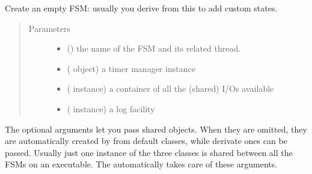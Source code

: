 \documentclass[letterpaper,10pt,english]{sphinxmanual}
\begin{document}
\begin{fulllineitems}
\label{\detokenize{fsm:fsmBase}}
Create an empty FSM: usually you derive from this to add custom states.
\begin{quote}\begin{description}
\item[{Parameters}] \leavevmode\begin{itemize}
\item {} 
 () \textendash{} the name of the FSM and its related thread.

\item {} 
 ({\hyperref[\detokenize{timer:fsmTimers}]{}} object) \textendash{} a timer manager instance

\item {} 
 ({\hyperref[\detokenize{io:fsmIOs}]{}} instance) \textendash{} a container of all the (shared) I/Os available

\item {} 
 ({\hyperref[\detokenize{logger:fsmLogger}]{}} instance) \textendash{} a log facility

\end{itemize}

\end{description}\end{quote}

The optional arguments let you pass shared objects. When they are omitted,
they are automatically created by {\hyperref[\detokenize{fsm:fsmBase}]{}} from default classes,
while derivate ones can be passed. Usually just one instance of the three
classes is shared between all the FSMs on an executable. The {\hyperref[\detokenize{loader:loader}]{}}
automatically takes care of these arguments.

\end{fulllineitems}
\end{document}
